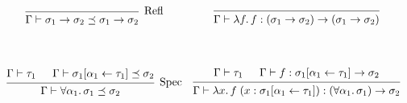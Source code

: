 \documentclass[12pt]{article}
\begin{document}
\pagestyle{empty}

\begin{align*}
    \def\arraystretch{5}
    \begin{array}{cc}
        \begin{prooftree}
            \infer0[Refl]{\Gamma \vdash \sigma_1 \to \sigma_2 \preceq \sigma_1 \to \sigma_2}
        \end{prooftree}
        &
        \begin{prooftree}
            \infer0{\Gamma \vdash \lambda f\ldotp f: (\sigma_1 \to \sigma_2) \to (\sigma_1 \to \sigma_2)}
        \end{prooftree}
        \\
        \begin{prooftree}
            \hypo{\Gamma \vdash \tau_1}
            \hypo{\Gamma \vdash \sigma_1[\alpha_1 \leftarrow \tau_1] \preceq \sigma_2}
            \infer2[Spec]{\Gamma \vdash \forall \alpha_1\ldotp \sigma_1 \preceq \sigma_2}
        \end{prooftree}
        &
        \begin{prooftree}
            \hypo{\Gamma \vdash \tau_1}
            \hypo{\Gamma \vdash f: \sigma_1[\alpha_1 \leftarrow \tau_1] \to \sigma_2}
            \infer2{\Gamma \vdash \lambda x\ldotp f\; (x: \sigma_1[\alpha_1 \leftarrow \tau_1]): (\forall \alpha_1\ldotp \sigma_1) \to \sigma_2}
        \end{prooftree}
    \end{array}
\end{align*}
\end{document}
